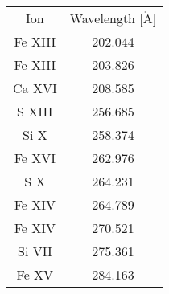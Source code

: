 \begin{tabular}{|c|c|}
Ion & Wavelength [$\mathrm{\mathring{A}}$] \\
Fe XIII & 202.044 \\
Fe XIII & 203.826 \\
Ca XVI & 208.585 \\
S XIII & 256.685 \\
Si X & 258.374 \\
Fe XVI & 262.976 \\
S X & 264.231 \\
Fe XIV & 264.789 \\
Fe XIV & 270.521 \\
Si VII & 275.361 \\
Fe XV & 284.163 \\
\end{tabular}
